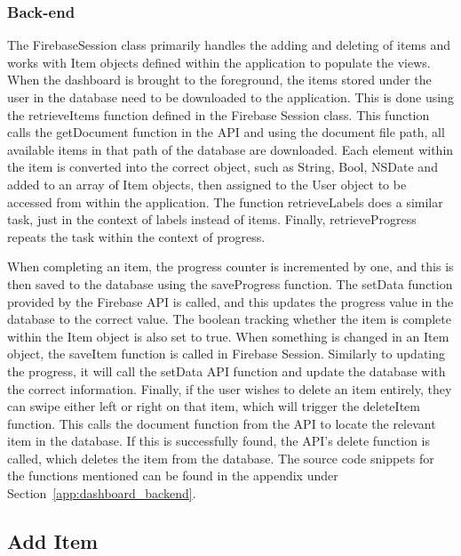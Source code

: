        
        
        \subsubsection{Back-end}
        \label{subsubsec:dashboard_backend}
        The FirebaseSession class primarily handles the adding and deleting of items and works with Item objects defined within the application to populate the views.  When the dashboard is brought to the foreground, the items stored under the user in the database need to be downloaded to the application. This is done using the retrieveItems function defined in the Firebase Session class.  This function calls the getDocument function in the API and using the document file path, all available items in that path of the database are downloaded.  Each element within the item is converted into the correct object, such as String, Bool, NSDate and added to an array of Item objects, then assigned to the User object to be accessed from within the application.  The function retrieveLabels does a similar task, just in the context of labels instead of items.  Finally, retrieveProgress repeats the task within the context of progress.
        
        When completing an item, the progress counter is incremented by one, and this is then saved to the database using the saveProgress function.  The setData function provided by the Firebase API is called, and this updates the progress value in the database to the correct value.  The boolean tracking whether the item is complete within the Item object is also set to true.  When something is changed in an Item object, the saveItem function is called in Firebase Session. Similarly to updating the progress, it will call the setData API function and update the database with the correct information.  Finally, if the user wishes to delete an item entirely, they can swipe either left or right on that item, which will trigger the deleteItem function.  This calls the document function from the API to locate the relevant item in the database. If this is successfully found, the API's delete function is called, which deletes the item from the database.  The source code snippets for the functions mentioned can be found in the appendix under Section~\ref{app:dashboard_backend}.
        
        \subsection{Add Item}

